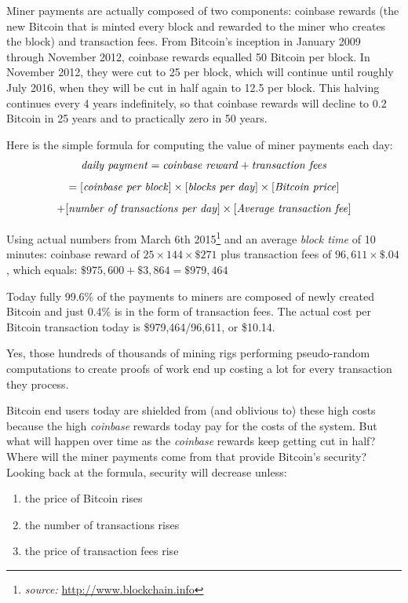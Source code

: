 \documentclass[a4paper,11pt]{article}
\begin{document}
Miner payments are actually composed of two components: coinbase rewards (the new Bitcoin that is minted every block and rewarded to the miner who creates the block) and transaction fees. From Bitcoin's inception in January 2009 through November 2012, coinbase rewards equalled 50 Bitcoin per block. In November 2012, they were cut to 25 per block, which will continue until roughly July 2016, when they will be cut in half again to 12.5 per block. This halving continues every 4 years indefinitely, so that coinbase rewards will decline to 0.2 Bitcoin in 25 years and to practically zero in 50 years.

Here is the simple formula for computing the value of miner payments each day:
$$ \text{\textit{daily payment}} = \text{\textit{coinbase reward}} + \text{\textit{transaction fees}} $$
$$= [\text{\textit{coinbase per block}}]\times [\text{\textit{blocks per day}}]\times [\text{\textit{Bitcoin price}}]$$ 
$$+ [\text{\textit{number of transactions per day}}]\times[\text{\textit{Average transaction fee}}] $$

Using actual numbers from March 6th 2015\footnote{\textit{source:} \url{http://www.blockchain.info}} and an average \textit{block time} of 10 minutes: coinbase reward of $25 \times 144 \times \$271$ plus transaction fees of $96,611 \times \$.04$, which equals: $\$975,600 + \$3,864 = \$979,464 $

Today fully 99.6\% of the payments to miners are composed of newly created Bitcoin and just 0.4\% is in the form of transaction fees. The actual cost per Bitcoin transaction today is \$979,464/96,611, or \$10.14. 

Yes, those hundreds of thousands of mining rigs performing pseudo-random computations to create proofs of work end up costing a lot for every transaction they process.

Bitcoin end users today are shielded from (and oblivious to) these high costs because the high \textit{coinbase} rewards today pay for the costs of the system. But what will happen over time as the \textit{coinbase} rewards keep getting cut in half? Where will the miner payments come from that provide Bitcoin's security? Looking back at the formula, security will decrease unless:
\begin{enumerate}
\setlength{\itemsep}{0pt}
\item{the price of Bitcoin rises}
\item{the number of transactions rises}
\item{the price of transaction fees rise}
\end{enumerate}
\end{document}
